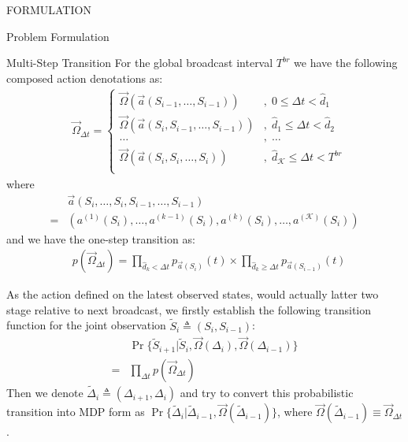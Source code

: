 \documentclass[10pt, conference, letterpaper]{IEEEtran}
\begin{document}
\begin{section}{FORMULATION}
\begin{subsection}{Problem Formulation}
\begin{subsubsection}{Multi-Step Transition}
                For the global broadcast interval $T^{br}$ we have the following composed action denotations as:
                \begin{align}
                    &\vec{\Omega}_{\Delta{t}} = 
                    \begin{cases}
                        \vec{\Omega}(\vec{a}(S_{i-1}, \dots, S_{i-1})) &,\; 0 \leq \Delta{t} < \hat{d}_1 \\
                        \vec{\Omega}(\vec{a}(S_{i}, S_{i-1}, \dots, S_{i-1})) &,\; \hat{d}_1 \leq \Delta{t}< \hat{d}_2 \\
                        \dots &,\; \dots \\
                        \vec{\Omega}(\vec{a}(S_{i}, S_{i}, \dots, S_{i})) &,\; \hat{d}_{\mathcal{K}} \leq \Delta{t} < T^{br} \\
                    \end{cases}
                \end{align}
                where
                \begin{align}
                    & \vec{a}(S_i,\dots, S_i,S_{i-1}, \dots,S_{i-1})
                    \nonumber\\
                    = & (a^{(1)}(S_i),\dots,a^{(k-1)}(S_i), a^{(k)}(S_i),\dots,a^{(\mathcal{K})}(S_i))
                \end{align}
                and we have the one-step transition as:
                \begin{align}
                    & p(\vec{\Omega}_{\Delta{t}})
                    = \prod_{\hat{d}_k<\Delta{t}}{ p_{\vec{a}(S_{i})}(t) }
                            \times
                            \prod_{\hat{d}_k\geq\Delta{t}}{ p_{\vec{a}(S_{i-1})}(t) }
                \end{align}

                As the action defined on the latest observed states, would actually latter two stage relative to next broadcast, we firstly establish the following transition function for the joint observation $\tilde{S}_i \triangleq (S_{i}, S_{i-1})$:
                \begin{align}
                    & \Pr\{\tilde{S}_{i+1} | \tilde{S}_{i}, \vec{\Omega}(\Delta_i), \vec{\Omega}(\Delta_{i-1})\} \nonumber\\
                    = & \prod_{\Delta{t}} p(\vec{\Omega}_{\Delta{t}})
                \end{align}
                Then we denote $\tilde{\Delta}_{i} \triangleq (\Delta_{i+1}, \Delta_{i})$ and try to convert this probabilistic transition into MDP form as $\Pr\{ \tilde{\Delta}_i | \tilde{\Delta}_{i-1}, \vec{\Omega}(\tilde{\Delta}_{i-1}) \}$, where $\vec{\Omega}(\tilde{\Delta}_{i-1}) \equiv \vec{\Omega}_{\Delta{t}}$.
            \end{subsubsection}


\end{subsection}
\end{section}
\end{document}
